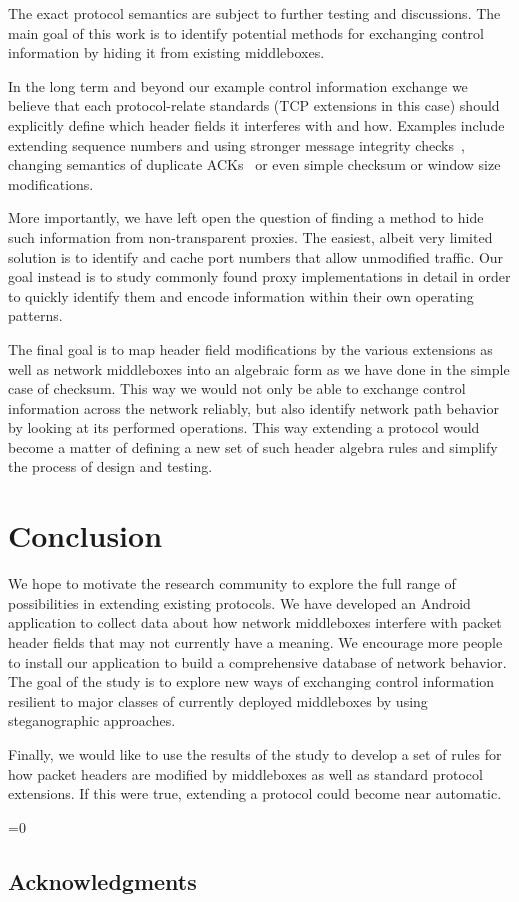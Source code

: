 \documentclass{sig-alternate-10pt}
\def\anon{1}        %
\begin{document}
The exact protocol semantics are subject to further testing and discussions. The main goal of this work is to identify potential methods for exchanging control information by hiding it from existing middleboxes.

In the long term and beyond our example control information exchange we believe that each protocol-relate standards (TCP extensions in this case) should explicitly define which header fields it interferes with and how. Examples include extending sequence numbers and using stronger message integrity checks~\cite{Mazieres:uz}, changing semantics of duplicate ACKs~\cite{Handley:vj,Flach:2013uy} or even simple checksum or window size modifications.

More importantly, we have left open the question of finding a method to hide such information from non-transparent proxies. The easiest, albeit very limited solution is to identify and cache port numbers that allow unmodified traffic. Our goal instead is to study commonly found proxy implementations in detail in order to quickly identify them and encode information within their own operating patterns.

The final goal is to map header field modifications by the various extensions as well as network middleboxes into an algebraic form as we have done in the simple case of checksum. This way we would not only be able to exchange control information across the network reliably, but also identify network path behavior by looking at its performed operations. This way extending a protocol would become a matter of defining a new set of such header algebra rules and simplify the process of design and testing.

\section{Conclusion}

We hope to motivate the research community to explore the full range of possibilities in extending existing protocols. We have developed an Android application to collect data about how network middleboxes interfere with packet header fields that may not currently have a meaning. We encourage more people to install our application to build a comprehensive database of network behavior. The goal of the study is to explore new ways of exchanging control information resilient to major classes of currently deployed middleboxes by using steganographic approaches. 

Finally, we would like to use the results of the study to develop a set of rules for how packet headers are modified by middleboxes as well as standard protocol extensions. If this were true, extending a protocol could become near automatic.

\ifnum\anon=0
\subsection*{Acknowledgments}

\fi


{


\small 

}

%
\end{document}
